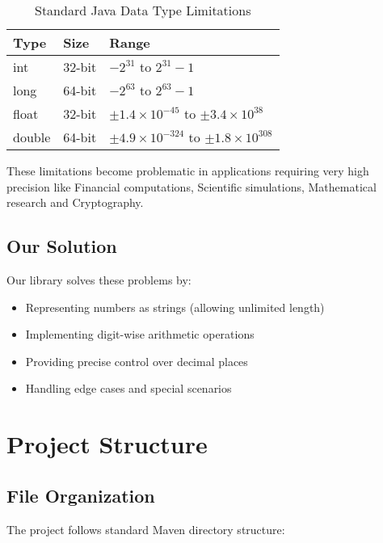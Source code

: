 \documentclass{article}
\begin{document}
\begin{table}[h]
\centering
\begin{tabular}{lll}
\toprule
\textbf{Type} & \textbf{Size} & \textbf{Range} \\
\midrule
int & 32-bit & $-2^{31}$ to $2^{31}-1$ \\
long & 64-bit & $-2^{63}$ to $2^{63}-1$ \\
float & 32-bit & $\pm1.4\times10^{-45}$ to $\pm3.4\times10^{38}$ \\
double & 64-bit & $\pm4.9\times10^{-324}$ to $\pm1.8\times10^{308}$ \\
\bottomrule
\end{tabular}
\caption{Standard Java Data Type Limitations}
\label{tab:types}
\end{table}

These limitations become problematic in applications requiring very high precision like Financial computations, Scientific simulations, Mathematical research and Cryptography.

\subsection{Our Solution}
Our library solves these problems by:
\begin{itemize}
    \item Representing numbers as strings (allowing unlimited length)
    \item Implementing digit-wise arithmetic operations
    \item Providing precise control over decimal places
    \item Handling edge cases and special scenarios
\end{itemize}

\section{Project Structure}
\subsection{File Organization}
The project follows standard Maven directory structure:
\end{document}
